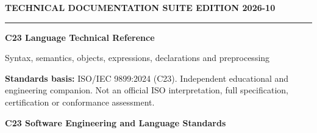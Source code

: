 \documentclass[10pt,letterpaper,oneside]{report}
\begin{document}
\hypersetup{pageanchor=false}%
\begin{titlepage}
\color{ink}\vspace*{1.2in}
{\sffamily\small\color{accent}\bfseries TECHNICAL DOCUMENTATION SUITE \hfill EDITION 2026-10}\par
\vspace{.3in}\rule{\linewidth}{1.5pt}\par\vspace{.22in}
{\Huge\bfseries C23 Language Technical Reference}\par\vspace{.22in}
{\Large\color{grayblue}Syntax, semantics, objects, expressions, declarations and preprocessing}\par\vspace{.4in}
\begin{keybox}\textbf{Standards basis:} ISO/IEC 9899:2024 (C23). Independent educational and engineering companion. Not an official ISO interpretation, full specification, certification or conformance assessment.\end{keybox}
\vfill{\large\bfseries C23 Software Engineering and Language Standards}\par{}\par
\end{titlepage}\hypersetup{pageanchor=true}
\tableofcontents\clearpage{}
\end{document}
